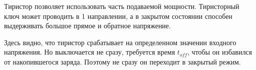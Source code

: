 Тиристор позволяет использовать часть подаваемой мощности. Тиристорный ключ может проводить в 1 направлении, а в закрытом состоянии способен выдерживать большое прямое и обратное напряжение. 
\begin{center}
	\begin{figure}[h!]
		\caption{}	
	\end{figure}
\end{center}

Здесь видно, что тиристор срабатывает на определенном значении входного напряжения. Но выключается не сразу, требуется время $t_{off}$, чтобы он избавился от накопившегося заряда. Поэтому не сразу он переходит в закрытый режим.
